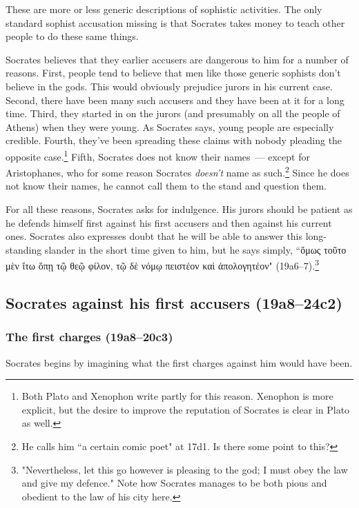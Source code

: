 \documentclass[11pt]{article}
\begin{document}
These are more or less generic descriptions of sophistic activities.  The only standard sophist accusation missing is that Socrates takes money to teach other people to do these same things.

Socrates believes that they earlier accusers are dangerous to him for a number of reasons.  First, people tend to believe that men like those generic sophists don't believe in the gods.  This would obviously prejudice jurors in his current case.  Second, there have been many such accusers and they have been at it for a long time.  Third, they started in on the jurors (and presumably on all the people of Athens) when they were young.  As Socrates says, young people are especially credible.  Fourth, they've been spreading these claims with nobody pleading the opposite case.\footnote{Both Plato and Xenophon write partly for this reason.  Xenophon is more explicit, but the desire to improve the reputation of Socrates is clear in Plato as well.}  Fifth, Socrates does not know their names~--- except for Aristophanes, who for some reason Socrates \emph{doesn't} name as such.\footnote{He calls him ``a certain comic poet" at 17d1.  Is there some point to this?}  Since he does not know their names, he cannot call them to the stand and question them.

For all these reasons, Socrates asks for indulgence.  His jurors should be patient as he defends himself first against his first accusers and then against his current ones.  Socrates also expresses doubt that he will be able to answer this long-standing slander in the short time given to him, but he says simply, ``ὅμως τοῦτο μὲν ἴτω ὅπῃ τῷ θεῷ φίλον, τῷ δὲ νόμῳ πειστέον καὶ ἀπολογητέον" (19a6--7).\footnote{"Nevertheless, let this go however is pleasing to the god; I must obey the law and give my defence." Note how Socrates manages to be both pious and obedient to the law of his city here.}

\subsection{Socrates against his first accusers (19a8--24c2)}

\subsubsection{The first charges (19a8--20c3)}

Socrates begins by imagining what the first charges against him would have been.
\end{document}
